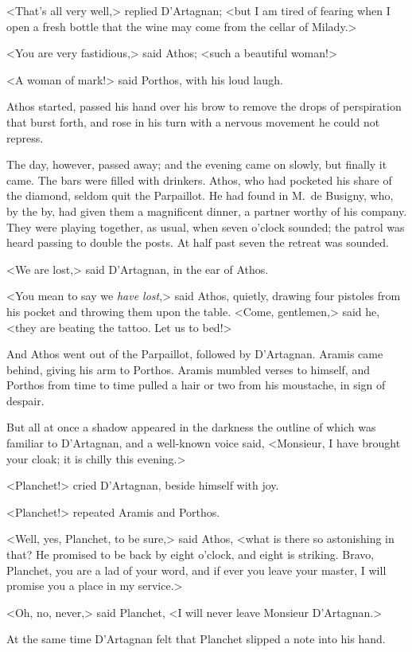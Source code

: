 <That's all very well,> replied D'Artagnan; <but I am tired of fearing when I open a fresh bottle that the wine may come from the cellar of Milady.> 

<You are very fastidious,> said Athos; <such a beautiful woman!> 

<A woman of mark!> said Porthos, with his loud laugh. 

Athos started, passed his hand over his brow to remove the drops of perspiration that burst forth, and rose in his turn with a nervous movement he could not repress. 

The day, however, passed away; and the evening came on slowly, but finally it came. The bars were filled with drinkers. Athos, who had pocketed his share of the diamond, seldom quit the Parpaillot. He had found in M.~de Busigny, who, by the by, had given them a magnificent dinner, a partner worthy of his company. They were playing together, as usual, when seven o'clock sounded; the patrol was heard passing to double the posts. At half past seven the retreat was sounded. 

<We are lost,> said D'Artagnan, in the ear of Athos. 

<You mean to say we \emph{have lost},> said Athos, quietly, drawing four pistoles from his pocket and throwing them upon the table. <Come, gentlemen,> said he, <they are beating the tattoo. Let us to bed!> 

And Athos went out of the Parpaillot, followed by D'Artagnan. Aramis came behind, giving his arm to Porthos. Aramis mumbled verses to himself, and Porthos from time to time pulled a hair or two from his moustache, in sign of despair. 

But all at once a shadow appeared in the darkness the outline of which was familiar to D'Artagnan, and a well-known voice said, <Monsieur, I have brought your cloak; it is chilly this evening.> 

<Planchet!> cried D'Artagnan, beside himself with joy. 

<Planchet!> repeated Aramis and Porthos. 

<Well, yes, Planchet, to be sure,> said Athos, <what is there so astonishing in that? He promised to be back by eight o'clock, and eight is striking. Bravo, Planchet, you are a lad of your word, and if ever you leave your master, I will promise you a place in my service.> 

<Oh, no, never,> said Planchet, <I will never leave Monsieur D'Artagnan.> 

At the same time D'Artagnan felt that Planchet slipped a note into his hand. 

